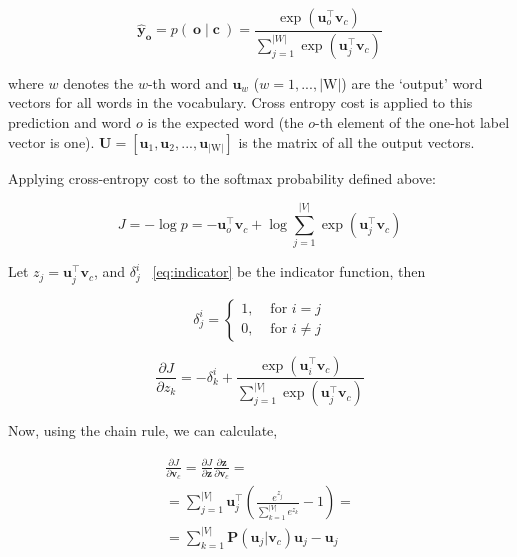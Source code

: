 \begin{equation}
{\hat{\boldsymbol y}}_{\boldsymbol o} = p(~{\boldsymbol o} \mid {\boldsymbol c}~) = \frac{\exp{({\boldsymbol u}^{\top}_{o}{\boldsymbol v}_{c})}}{\sum^{\vert{W}\vert}_{j=1}\exp{({\boldsymbol u}^{\top}_{j}{\boldsymbol v}_{c})}}
\end{equation}

where $w$ denotes the $w$-th word and ${\boldsymbol u}_{w}$ ($w=1,...,\vert\textrm{W}\vert$)  are the `output' word vectors for all words in the vocabulary. Cross entropy cost is applied to this prediction and word $o$ is the expected word (the $o$-th element of the one-hot label vector is one). ${\boldsymbol U} = [ {\boldsymbol u}_{1}, {\boldsymbol u}_{2},...,{\boldsymbol u}_{\vert\textrm{W}\vert}]$ is the matrix of all the output vectors. 

Applying cross-entropy cost to the softmax probability defined above:

\begin{equation}
J =-\log{p} = - {\boldsymbol u}_{o}^{\top}{\boldsymbol v}_{c} + \log\sum^{\vert{V}\vert}_{j=1}\exp{({\boldsymbol u}_{j}^{\top}{\boldsymbol v}_{c})}
\end{equation}

Let $z_{j}={\boldsymbol u}_{j}^{\top}{\boldsymbol v}_{c}$, and $\delta^{i}_{j}$ ~\ref{eq:indicator} be the indicator function, then

\begin{equation}
\label{eq:indicator}
\delta^{i}_{j} =  
	\begin{cases}
	1, &\text{ for }i=j \\
	0, &\text{ for }i\neq j
	\end{cases}
\end{equation}


\begin{equation}
\frac{\partial J}{\partial{z_{k}}} = - \delta^{i}_{k} + \frac{\exp{({\boldsymbol u}_{i}^{\top}{\boldsymbol v}_{c})}}{\sum^{\vert{V}\vert}_{j=1}\exp{({\boldsymbol u}_{j}^{\top}{\boldsymbol v}_{c})}}
\end{equation}

Now, using the chain rule, we can calculate,

\begin{equation}
	\begin{multlined}
	\frac{\partial J}{\partial{{\boldsymbol v}_{c}}} =  \frac{\partial J}{\partial{{\boldsymbol z}}}\frac{\partial{{\boldsymbol z}}}{\partial{{\boldsymbol v}_{c}}} =\\
	= \sum^{\vert{V}\vert}_{j=1}{\boldsymbol u}_{j}^{\top}\left(\frac{e^{z_{j}}}{\sum^{\vert{V}\vert}_{k=1}e^{z_{k}}} -  1\right) =\\
	= \sum^{\vert{V}\vert}_{k=1}{\boldsymbol P}({\boldsymbol u}_{j} \vert {\boldsymbol v}_{c} ){\boldsymbol u}_{j} - {\boldsymbol u}_{j}
	\end{multlined}
\end{equation}


